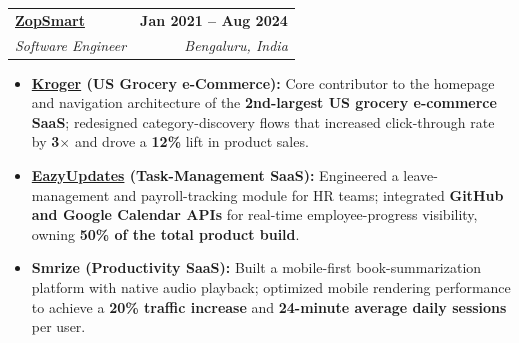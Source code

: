 \documentclass[letterpaper,10.5pt]{article}
\makeatletter
\newcommand{\entry}[4]{%
  \begin{tabularx}{\linewidth}{@{}X@{}r@{}}
    \textbf{#1} & \textbf{#4} \\
    \textit{#2} & \textit{#3} \\
  \end{tabularx}%
  \vspace{1pt}
}
\makeatother
\begin{document}
\entry{\href{https://zopsmart.com}{ZopSmart}}{Software Engineer}{Bengaluru, India}{Jan 2021 -- Aug 2024}
\begin{itemize}
  \item \textbf{\href{https://www.kroger.com}{Kroger} (US Grocery e-Commerce):} Core contributor to the homepage and navigation architecture of the \textbf{2nd-largest US grocery e-commerce SaaS}; redesigned category-discovery flows that increased click-through rate by \textbf{3$\times$} and drove a \textbf{12\%} lift in product sales.
  \item \textbf{\href{https://eazyupdates.com}{EazyUpdates} (Task-Management SaaS):} Engineered a leave-management and payroll-tracking module for HR teams; integrated \textbf{GitHub and Google Calendar APIs} for real-time employee-progress visibility, owning \textbf{50\% of the total product build}.
  \item \textbf{Smrize (Productivity SaaS):} Built a mobile-first book-summarization platform with native audio playback; optimized mobile rendering performance to achieve a \textbf{20\% traffic increase} and \textbf{24-minute average daily sessions} per user.
\end{itemize}
\end{document}
